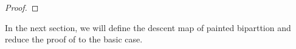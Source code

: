 \documentclass[12pt,a4paper]{amsart}
\numberwithin{equation}{section}
\theoremstyle{remark}
\def\BOX#1{\mathrm{Box}(#1)}
\def\PPm{\wp_{\downarrow}}
\def\uptaum{\uptau_{\downarrow}}
\begin{document}
\begin{proof}

\end{proof}

In the next section, we will define the descent map of painted biparttion and reduce the proof of
 to the basic case.
\end{document}
